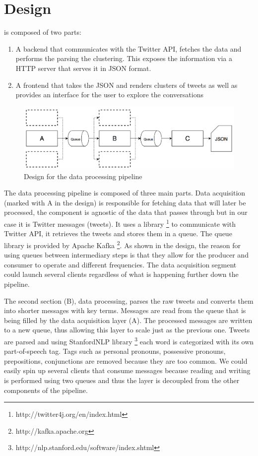 \chapter{Design}
\label{chapter:design}

{\project} is composed of two parts:
\begin{enumerate}
  \item A backend that communicates with the Twitter API, fetches the data and performs the parsing the clustering. This exposes the information via a HTTP server that serves it in JSON format.
  \item A frontend that takes the JSON and renders clusters of tweets as well as provides an interface for the user to explore the conversations 
\end{enumerate}

\begin{figure}[ht!]
\centering
\includegraphics[width=\textwidth,height=\textheight,keepaspectratio]{src/img/design.png}
\caption{Design for the data processing pipeline\label{overflow}}
\end{figure}

The data processing pipeline is composed of three main parts. Data acquisition (marked with A in the design) is responsible for fetching data that will later be processed, the component is agnostic of the data that passes through but in our case it is Twitter messages (tweets). It uses a library \footnote{http://twitter4j.org/en/index.html} to communicate with Twitter API, it retrieves the tweets and stores them in a queue. The queue library is provided by Apache Kafka \footnote{http://kafka.apache.org}. As shown in the design, the reason for using queues between intermediary steps is that they allow for the producer and consumer to operate and different frequencies. The data acquisition segment could launch several clients regardless of what is happening further down the pipeline.

The second section (B), data processing, parses the raw tweets and converts them into shorter messages with key terms. Messages are read from the queue that is being filled by the data acquisition layer (A). The processed messages are written to a new queue, thus allowing this layer to scale just as the previous one. Tweets are parsed and using StanfordNLP library \footnote{http://nlp.stanford.edu/software/index.shtml} each word is categorized with its own part-of-speech tag. Tags such as personal pronouns, possessive pronouns, prepositions, conjunctions are removed because they are too common. We could easily spin up several clients that consume messages because reading and writing is performed using two queues and thus the layer is decoupled from the other components of the pipeline.

